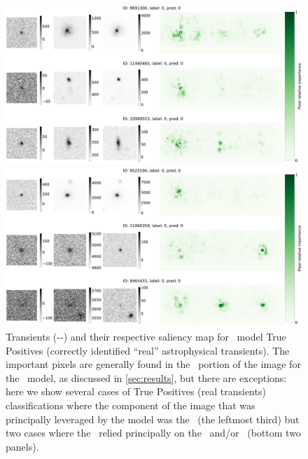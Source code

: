 \clearpage
\begin{figure}
    \centering
    \includegraphics[width=0.8\linewidth]{
    figures/saliency_plot_other3-see64.pdf}
    
    \includegraphics[width=0.8\linewidth]{
    figures/saliency_plot_other3-see109.pdf}
    \caption{Transients (\diff-\search-\temp) and their respective saliency map  for \diabased\ model True Positives  (correctly identified ``real'' astrophysical transients). The important pixels are generally found in the \diff\ portion of the image for the \diabased\ model, as discussed in \autoref{sec:results}, but there are exceptions: here we show several cases of True Positives (real transients) classifications where the component of the image that was principally leveraged by the model was the \diff\ (the leftmost third) but two cases where the \nodia\ relied principally on the \search\ and/or \temp\ (bottom two panels).}
    \label{fig:saliency_dia3id_TP}
\end{figure}


